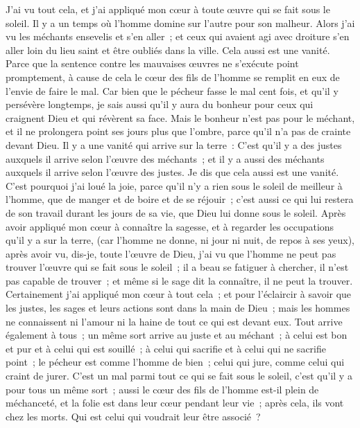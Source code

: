 \begin{multicols}{2}
J'ai vu tout cela, et j'ai appliqué mon cœur à toute œuvre qui se fait sous le soleil. Il y a un temps où l'homme domine sur l'autre pour son malheur.
Alors j'ai vu les méchants ensevelis et s'en aller~; et ceux qui avaient agi avec droiture s'en aller loin du lieu saint et être oubliés dans la ville. Cela aussi est une vanité.
Parce que la sentence contre les mauvaises œuvres ne s'exécute point promptement, à cause de cela le cœur des fils de l'homme se remplit en eux de l'envie de faire le mal.
Car bien que le pécheur fasse le mal cent fois, et qu'il y persévère longtemps, je sais aussi qu'il y aura du bonheur pour ceux qui craignent Dieu et qui révèrent sa face.
Mais le bonheur n'est pas pour le méchant, et il ne prolongera point ses jours plus que l'ombre, parce qu'il n'a pas de crainte devant Dieu.
Il y a une vanité qui arrive sur la terre~: C'est qu'il y a des justes auxquels il arrive selon l'œuvre des méchants~; et il y a aussi des méchants auxquels il arrive selon l'œuvre des justes. Je dis que cela aussi est une vanité.
C'est pourquoi j'ai loué la joie, parce qu'il n'y a rien sous le soleil de meilleur à l'homme, que de manger et de boire et de se réjouir~; c'est aussi ce qui lui restera de son travail durant les jours de sa vie, que Dieu lui donne sous le soleil. 
Après avoir appliqué mon cœur à connaître la sagesse, et à regarder les occupations qu'il y a sur la terre, (car l'homme ne donne, ni jour ni nuit, de repos à ses yeux), 
après avoir vu, dis-je, toute l'œuvre de Dieu, j'ai vu que l'homme ne peut pas trouver l'œuvre qui se fait sous le soleil~; il a beau se fatiguer à chercher, il n'est pas capable de trouver~; et même si le sage dit la connaître, il ne peut la trouver.
\VerseOne{}Certainement j'ai appliqué mon cœur à tout cela~; et pour l'éclaircir à savoir que les justes, les sages et leurs actions sont dans la main de Dieu~; mais les hommes ne connaissent ni l'amour ni la haine de tout ce qui est devant eux. 
Tout arrive également à tous~; un même sort arrive au juste et au méchant~; à celui est bon et pur et à celui qui est souillé~; à celui qui sacrifie et à celui qui ne sacrifie point~; le pécheur est comme l'homme de bien~; celui qui jure, comme celui qui craint de jurer. 
C'est un mal parmi tout ce qui se fait sous le soleil, c'est qu'il y a pour tous un même sort~; aussi le cœur des fils de l'homme est-il plein de méchanceté, et la folie est dans leur cœur pendant leur vie~; après cela, ils vont chez les morts. Qui est celui qui voudrait leur être associé~?

\end{multicols}
